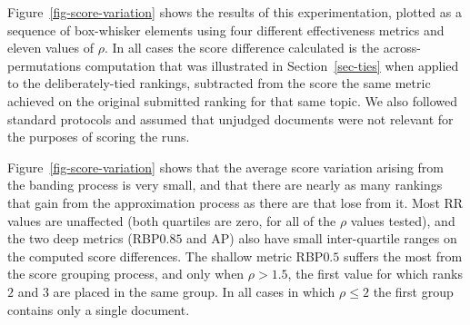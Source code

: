 Figure~\ref{fig-score-variation} shows the results of this
experimentation, plotted as a sequence of box-whisker elements using
four different effectiveness metrics and eleven values of $\rho$.
In all cases the score difference calculated is the
across-permutations computation that was illustrated in
Section~\ref{sec-ties} when applied to the deliberately-tied
rankings, subtracted from the score the same metric achieved on the
original submitted ranking for that same topic.
We also followed standard protocols and assumed that unjudged
documents were not relevant for the purposes of scoring the runs.

Figure~\ref{fig-score-variation} shows that the average score
variation arising from the banding process is very small, and that
there are nearly as many rankings that gain from the approximation
process as there are that lose from it.
Most RR values are unaffected (both quartiles are zero, for all of
the $\rho$ values tested), and the two deep metrics (RBP$0.85$ and
AP) also have small inter-quartile ranges on the computed score
differences.
The shallow metric RBP$0.5$ suffers the most from the score grouping
process, and only when $\rho>1.5$, the first value for which ranks
$2$ and $3$ are placed in the same group.
In all cases in which $\rho\le2$ the first group contains only a
single document.


